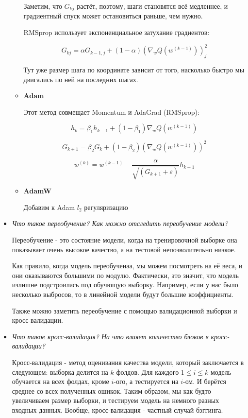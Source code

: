 \documentclass[a4paper]{article}
\begin{document}
\begin{itemize}
\begin{itemize}
Заметим, что $G_{kj}$ растёт, поэтому, шаги становятся всё медленнее, и градиентный спуск может остановиться раньше, чем нужно.

RMSprop использует экспоненциальное затухание градиентов:

\[ G_{kj} = \alpha G_{k-1,j} + (1-\alpha) \left( \nabla_w Q( w^{(k-1)}) \right)_j^2 \]

Тут уже размер шага по координате зависит от того, насколько быстро мы двигались по ней на последних шагах.

\item \textbf{Adam} 

Этот метод совмещает Momentum и AdaGrad (RMSprop):

\[ h_k = \beta_1 h_{k-1} + (1-\beta_1) \nabla_w Q( w^{(k-1)} )\]

\[ G_{k+1} = \beta_2 G_k + (1-\beta_2) \left( \nabla_w Q(w^{(k-1)}) \right)^2 \]

\[ w^{(k)} = w^{(k-1)} - \frac{\alpha}{\sqrt{(G_{k+1} + \varepsilon)}} h_{k-1}\]

\item \textbf{AdamW}

Добавим к Adam $l_2$ регуляризацию

\end{itemize}


\item \textit{Что такое переобучение? Как можно отследить переобучение модели?}

Переобучение - это состояние модели, когда на тренировочной выборке она показывает очень высокое качество, а на тестовой непозволительно низкое.

Как правило, когда модель переобученаа, мы можем посмотреть на её веса, и они оказываются большими по модулю. Фактически, это значит, что модель излишне подстроилась под обучющую выборку. Например, если у нас было несколько выбросов, то в линейной модели будут большие коэффициенты.

Также можно заметить переобучение с помощью валидационной выборки и кросс-валидации.

\item \textit{Что такое кросс-валидация? На что влияет количество блоков в кросс-валидации?}

Кросс-валидация - метод оценивания качества модели, который заключается в следующем: выборка делится на $k$ фолдов. Для каждого $1\leq i \leq k$ модель обучается на всех фолдах, кроме $i$-ого, а тестируется на $i$-ом. И берётся среднее со всех полученных ошикок. Таким образом, мы как будто увеличиваем размер выборки, и тестируем модель на немного разных входных данных. Вообще, кросс-валидация - частный случай бэггинга.


\end{itemize}
\end{document}
